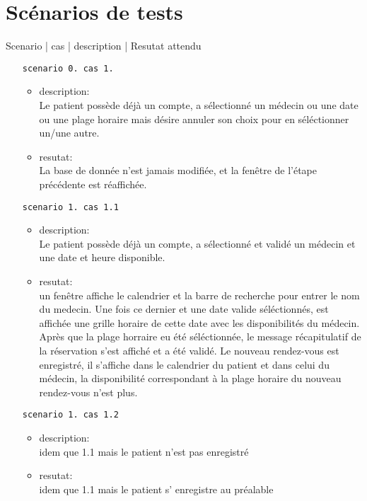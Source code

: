 \documentclass[a4paper, 11pt]{report}
\begin{document}
	\section{Scénarios de tests}
	Scenario |   cas  |         description    |   Resutat attendu 

	\begin{itemize}
		\item[\texttt{scenario 0. cas 1.}]
			\begin{itemize}
				\item description: \\
					Le patient possède déjà un compte, a sélectionné un médecin ou une date ou une
					plage horaire mais désire annuler son choix pour en séléctionner un/une autre.
				\item resutat:\\
					La base de donnée n’est jamais modifiée, et la fenêtre de l’étape précédente
					est réaffichée.
			\end{itemize}
		\item[\texttt{scenario 1. cas 1.1}]
			\begin{itemize}
				\item description:  \\
					Le patient possède déjà un compte, a sélectionné et validé
					un médecin et une date et heure disponible.
				\item resutat: \\
					un fenêtre affiche le calendrier et la barre de recherche
					pour entrer le nom du medecin. 
					Une fois ce dernier et une date valide séléctionnés, est
					affichée une grille horaire de cette date avec les
					disponibilités du médecin. Après que la plage horraire eu
					été séléctionnée, 
					le message récapitulatif de la réservation s’est affiché et
					a été validé. 
					Le nouveau rendez-vous est enregistré, il s’affiche dans le
					calendrier du patient et dans celui du médecin, la
					disponibilité correspondant à la plage horaire du nouveau
					rendez-vous n’est plus.
			\end{itemize}
		\item[\texttt{scenario 1. cas 1.2}]
			\begin{itemize}
				\item description:  \\
					idem que 1.1 mais le patient n’est pas enregistré
				\item resutat: \\
					idem que 1.1 mais le patient s’ enregistre au préalable

\end{itemize}
\end{itemize}
\end{document}
